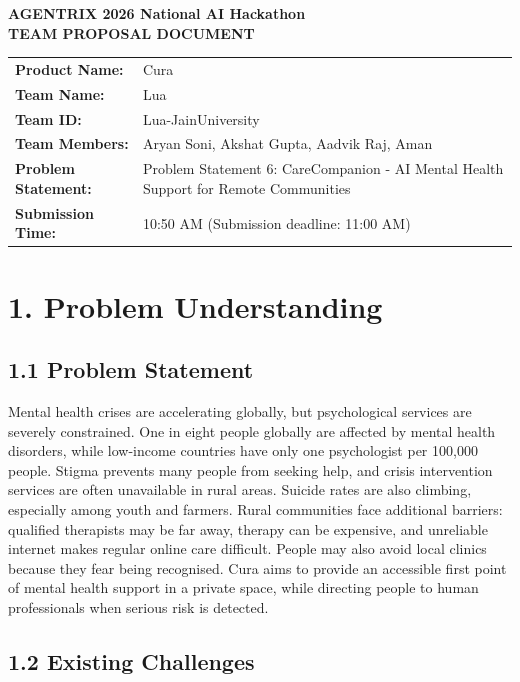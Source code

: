 \documentclass[9pt,a4paper]{article}
\begin{document}
\begin{center}
  {\large\textbf{AGENTRIX 2026 National AI Hackathon}}\\[0.25em]
  {\large\textbf{TEAM PROPOSAL DOCUMENT}}\\[0.5em]
\end{center}

\begin{tabularx}{\textwidth}{@{}lY@{}}
\textbf{Product Name:} & Cura \\
\textbf{Team Name:} & Lua \\
\textbf{Team ID:} & Lua-JainUniversity \\
\textbf{Team Members:} & Aryan Soni, Akshat Gupta, Aadvik Raj, Aman \\
\textbf{Problem Statement:} & Problem Statement 6: CareCompanion - AI Mental Health Support for Remote Communities \\
\textbf{Submission Time:} & 10:50 AM \quad (Submission deadline: 11:00 AM) \\
\end{tabularx}

\section*{1. Problem Understanding}

\subsection*{1.1 Problem Statement}

Mental health crises are accelerating globally, but psychological services are
severely constrained. One in eight people globally are affected by mental
health disorders, while low-income countries have only one psychologist per
100,000 people. Stigma prevents many people from seeking help, and crisis
intervention services are often unavailable in rural areas. Suicide rates are
also climbing, especially among youth and farmers. Rural communities face
additional barriers: qualified therapists may be far away, therapy can be
expensive, and unreliable internet makes regular online care difficult. People
may also avoid local clinics because they fear being recognised. Cura aims to
provide an accessible first point of mental health support in a private space,
while directing people to human professionals when serious risk is detected.

\subsection*{1.2 Existing Challenges}
\end{document}

